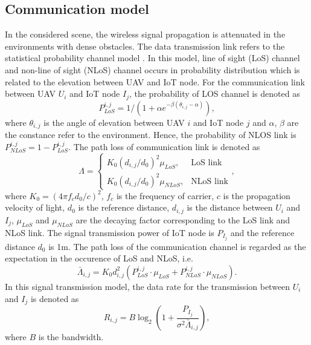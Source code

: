 \documentclass[journal]{IEEEtran}
\begin{document}
\subsection{Communication model}\label{comm_model}
In the considered scene, the wireless signal propagation is attenuated in the environments with dense obstacles. The data transmission link refers to the statistical probability channel model \cite{MLi22}. In this model, line of sight (LoS) channel and non-line of sight (NLoS) channel occurs in probability distribution which is related to the elevation between UAV and IoT node. For the communication link between UAV $U_i$ and IoT node $I_j$, the probability of LOS channel is denoted as 
\begin{equation}\label{p_los}
  P_{LoS}^{i,j}=1/\left(1+\alpha e^{-\beta\left({\theta_{i,j}-\alpha}\right)}\right), 
\end{equation}
where $\theta_{i,j}$ is the angle of elevation between UAV $i$ and IoT node $j$ and $\alpha$, $\beta$ are the constance refer to the environment. Hence, the probability of NLOS link is $P_{NLoS}^{i,j}=1-P_{LoS}^{i,j}$. The path loss of communication link is denoted as 
\begin{equation}\label{path_loss}
\Lambda=
\begin{cases}
            K_0 \left({d_{i,j}/d_0}\right)^2 \mu_{LoS}, & \mbox{LoS link}\\
            K_0 \left({d_{i,j}/d_0}\right)^2 \mu_{NLoS}, & \mbox{NLoS link}
\end{cases}, 
\end{equation}
where $K_0=\left({4\pi f_c d_0 /c}\right)^2$, $f_c$ is the frequency of carrier, $c$ is the propagation velocity of light, $d_0$ is the reference distance, $d_{i,j}$ is the distance between $U_i$ and $I_j$, $\mu_{LoS}$ and $\mu_{NLoS}$ are the decaying factor corresponding to the LoS link and NLoS link. The signal transmission power of IoT node is $P_{I_j}$ and the reference distance $d_0$ is 1m. The path loss of the communication channel is regarded as the expectation in the occurence of LoS and NLoS, i.e. 
\begin{equation}\label{avg_path_loss}
  \bar{\Lambda}_{i,j}=K_0 d_{i,j}^2 \left(P_{LoS}^{i,j}\cdot\mu_{LoS}+P_{NLoS}^{i,j}\cdot\mu_{NLoS}\right).
\end{equation}
In this signal transmission model, the data rate for the transmission between $U_i$ and $I_j$ is denoted as 
\begin{equation}\label{data_rate}
  R_{i,j}=B\log_{2}\left(1+\frac{P_{I_j}}{\sigma^2 \bar{\Lambda}_{i,j}}\right),
\end{equation}
where $B$ is the bandwidth.
\end{document}
